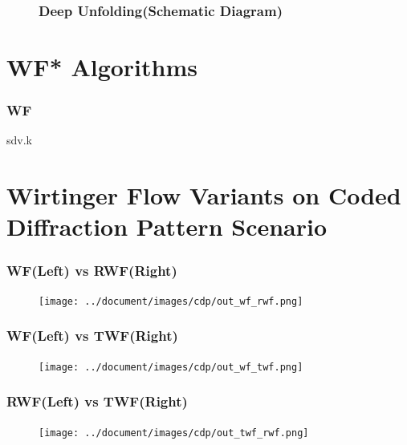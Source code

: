 \documentclass{beamer}
\theoremstyle{definition}
\theoremstyle{remark}
\begin{document}
\begin{frame}
  \begin{figure}
    \frametitle{Deep Unfolding(Schematic Diagram)}
    \centering
    \resizebox{1.0\textwidth}{!}{}
    \label{fig:deep_unfolding}
  \end{figure}
\end{frame}

\section[WF* Algorithms]{WF* Algorithms}
\begin{frame}
  \frametitle{WF}

sdv.k
\end{frame}




\section[WF* Using CDPs]{Wirtinger Flow Variants on Coded Diffraction Pattern Scenario}



\begin{frame}
\frametitle{WF(Left) vs RWF(Right)}
  \begin{figure}[!htbp]
    \centering
    \texttt{[image: ../document/images/cdp/out\_wf\_rwf.png]}
  \label{image:wf_vs_rwf}
  \end{figure}
\end{frame}

\begin{frame}
   \frametitle{WF(Left) vs TWF(Right)}
     \begin{figure}[!htbp]
       \centering
       \texttt{[image: ../document/images/cdp/out\_wf\_twf.png]}
     \label{images:wf_vs_twf_cdp}
     \end{figure}
   \end{frame}
\begin{frame}
\frametitle{RWF(Left) vs TWF(Right)}
  \begin{figure}[!htbp]
    \centering
    \texttt{[image: ../document/images/cdp/out\_twf\_rwf.png]}
  \label{image:twf_vs_rwf_cdp}
  \end{figure}
\end{frame}
\end{document}
